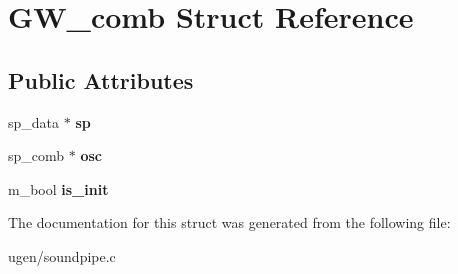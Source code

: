 \hypertarget{structGW__comb}{}\section{G\+W\+\_\+comb Struct Reference}
\label{structGW__comb}
\subsection*{Public Attributes}
\begin{DoxyCompactItemize}
\item 
\hypertarget{structGW__comb_a5b1f5f473a04e5aac96865fb08b87809}{}\label{structGW__comb_a5b1f5f473a04e5aac96865fb08b87809} 
sp\+\_\+data $\ast$ {\bfseries sp}
\item 
\hypertarget{structGW__comb_a35d4494406e83cf2fd439b5c925cab2d}{}\label{structGW__comb_a35d4494406e83cf2fd439b5c925cab2d} 
sp\+\_\+comb $\ast$ {\bfseries osc}
\item 
\hypertarget{structGW__comb_a6c9840a514e031ff54b7bb3c8092c446}{}\label{structGW__comb_a6c9840a514e031ff54b7bb3c8092c446} 
m\+\_\+bool {\bfseries is\+\_\+init}
\end{DoxyCompactItemize}


The documentation for this struct was generated from the following file\+:\begin{DoxyCompactItemize}
\item 
ugen/soundpipe.\+c\end{DoxyCompactItemize}
